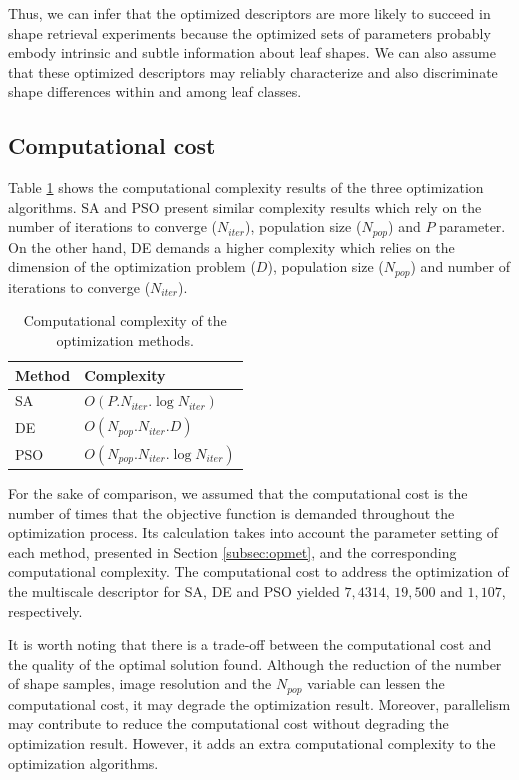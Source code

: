 {Thus, we can infer that the optimized descriptors are more likely to succeed in shape retrieval experiments because the optimized sets of parameters probably embody intrinsic and subtle information about leaf shapes. We can also assume that these optimized descriptors may reliably characterize and also discriminate shape differences within and among leaf classes. 

\subsection{Computational cost \label{sec:comp_cost}}

Table \ref{tbl:complexity} shows the computational complexity results of the three optimization algorithms. SA and PSO present similar complexity results which rely on the number of iterations to converge ($N_{iter}$), population size ($N_{pop}$) and $P$ parameter. On the other hand,  DE  demands a higher complexity which relies on the dimension of the optimization problem ($D$), population size ($N_{pop}$) and number of iterations to converge ($N_{iter}$).

\begin{table}[h!]
\centering
\caption{Computational complexity of the optimization methods.}
\label{tbl:complexity}
  \begin{tabular}{ll}
  \toprule[1.5pt]
 Method & Complexity\\
 \midrule
   SA  & $O(P.N_{iter}.\log{N_{iter}})$    \\
   DE  & $O(N_{pop}.N_{iter}.D)$   \\
   PSO&  $O(N_{pop}.N_{iter}.\log{N_{iter}})$\\
  \bottomrule[1.5pt]
  \end{tabular}
\end{table}

For the sake of comparison, we assumed that the computational cost is the number of times that the objective function is demanded throughout the optimization process. Its calculation takes into account the parameter setting of each method, presented in Section \ref{subsec:opmet}, and the corresponding computational complexity.  The computational cost to address the optimization of the multiscale descriptor for SA, DE and PSO yielded $7,4314$, $19,500$ and $1,107$, respectively. 

It is worth noting that there is a trade-off between the computational cost and the quality of the optimal solution found. Although the reduction of the number of shape samples, image resolution and the $N_{pop}$ variable can lessen the computational cost, it may degrade the optimization result. Moreover, parallelism may contribute to reduce the computational cost without degrading the optimization result.  However, it adds an extra computational complexity to the optimization algorithms.

}


